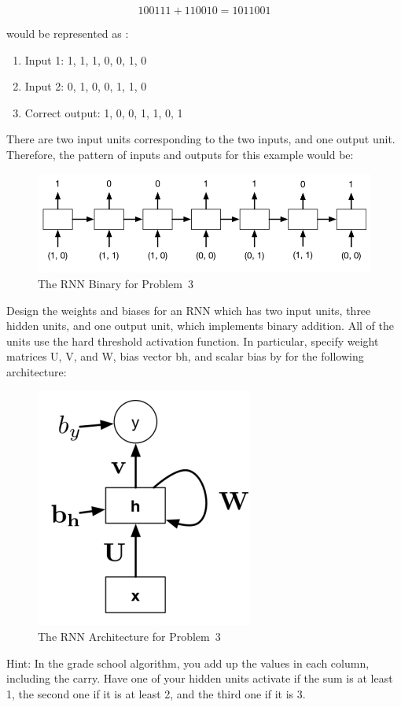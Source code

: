 \documentclass[11pt]{article}
\begin{document}
\begin{equation}
  100111 + 110010 = 1011001
\end{equation}

would be represented as :

\begin{enumerate}
  \item Input 1: 1, 1, 1, 0, 0, 1, 0
  \item Input 2: 0, 1, 0, 0, 1, 1, 0
  \item Correct output: 1, 0, 0, 1, 1, 0, 1
\end{enumerate}

There are two input units corresponding to the two inputs, and one output unit. Therefore, the pattern of inputs and outputs for this example would be:

\begin{figure}[!h]
  \centering
      \includegraphics[width=0.8\linewidth]{RNN_binary.png}
      \caption{The RNN Binary for Problem~3 }
      \label{fig:RNN}
\end{figure}

Design the weights and biases for an RNN which has two input units, three hidden units, and one output unit, which implements binary addition. All of the units use the hard threshold activation function. In particular, specify weight matrices U, V, and W, bias vector bh, and scalar bias by for the following architecture:

\begin{figure}[!h]
  \centering
      \includegraphics[width=0.3\linewidth]{RNN_arch.png}
      \caption{The RNN Architecture for Problem~3 }
      \label{fig:RNN}
\end{figure}

Hint: In the grade school algorithm, you add up the values in each column, including the
carry. Have one of your hidden units activate if the sum is at least 1, the second one if it is
at least 2, and the third one if it is 3.
\end{document}
